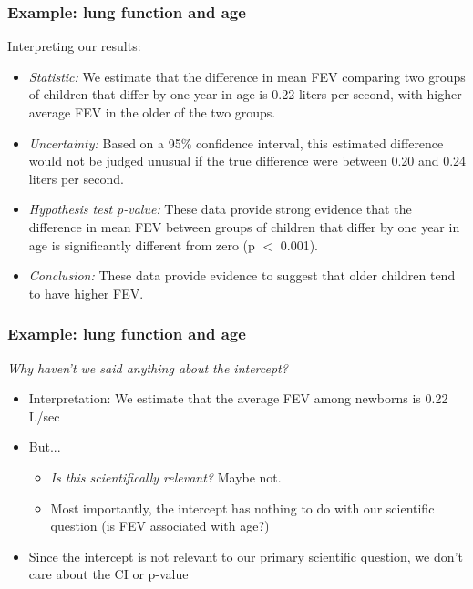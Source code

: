 \documentclass[12pt, 
hyperref={colorlinks=true, linkcolor=blue, urlcolor=cyan}]{beamer}
\begin{document}
\begin{frame}
\frametitle{Example: lung function and age}
Interpreting our results:\vspace{-0.3cm}
\begin{itemize}
\item \textit{Statistic:} We estimate that the difference in mean FEV comparing two groups of children that differ by one year in age is 0.22 liters per second, with higher average FEV in the older of the two groups. \pause
\item \textit{Uncertainty:} Based on a 95\% confidence interval, this estimated difference would not be judged unusual if the true difference were between 0.20 and 0.24 liters per second.\pause
\item \textit{Hypothesis test p-value:} These data provide strong evidence that the difference in mean FEV between groups of children that differ by one year in age is significantly different from zero (p $<$ 0.001). \pause
\item \textit{Conclusion:} These data provide evidence to suggest that older children tend to have higher FEV. 
\end{itemize}
\end{frame}

\begin{frame}
\frametitle{Example: lung function and age}
\textit{Why haven't we said anything about the intercept?} \pause
\begin{itemize}
\item Interpretation: We estimate that the average FEV among newborns is 0.22 L/sec \pause
\item But... 
	\begin{itemize}
	\item \textit{Is this scientifically relevant?} Maybe not.
	\item Most importantly, \color{blue} the intercept has nothing to do with our scientific question \color{black} (is FEV associated with age?) \pause
	\end{itemize}
\item Since the intercept is not relevant to our primary scientific question, we don't care about the CI or p-value
\end{itemize}
\end{frame}


\end{document}
